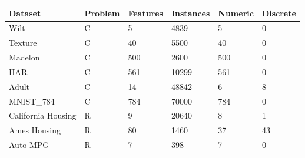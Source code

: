 \begin{tabular}{llllll}
\hline
Dataset & Problem & Features & Instances & Numeric & Discrete \\
\hline
Wilt & C & 5 & 4839 & 5 & 0 \\
Texture & C & 40 & 5500 & 40 & 0 \\
Madelon & C & 500 & 2600 & 500 & 0 \\
HAR & C & 561 & 10299 & 561 & 0 \\
Adult & C & 14 & 48842 & 6 & 8 \\
MNIST\_784 & C & 784 & 70000 & 784 & 0 \\
California Housing & R & 9 & 20640 & 8 & 1 \\
Ames Housing & R & 80 & 1460 & 37 & 43 \\
Auto MPG & R & 7 & 398 & 7 & 0 \\
\hline
\end{tabular}
